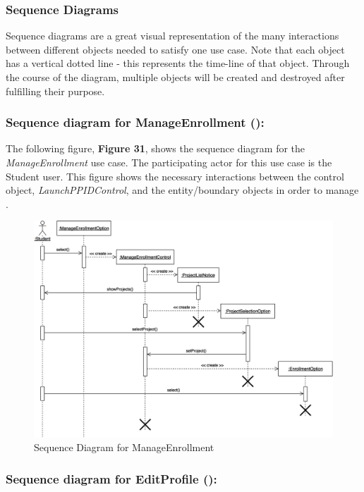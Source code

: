 \documentclass[12pt,letterpaper]{article}
\begin{document}
\subsubsection*{Sequence Diagrams}

Sequence diagrams are a great visual representation of the many interactions between different objects needed to satisfy one use case. Note that
each object has a vertical dotted line - this represents the time-line of that object. Through the course of the diagram, multiple objects will be created
and destroyed after fulfilling their purpose.

\subsubsection*{Sequence diagram for ManageEnrollment (\manageenrollment{}):}

The following figure, {\bf Figure 31}, shows the sequence diagram for the {\it ManageEnrollment} use case. The participating actor for this use case
is the Student user. This figure shows the necessary interactions between the control object, {\it LaunchPPIDControl}, and the entity/boundary objects
in order to manage \manageenrollment{}.

\begin{figure}[H]
	\centering{}
	\includegraphics[scale=0.3]{imgs/seq/manage-enrollment.png}
	\caption{Sequence Diagram for ManageEnrollment}
\end{figure}

\subsubsection*{Sequence diagram for EditProfile (\editprofile{}):}
\end{document}
